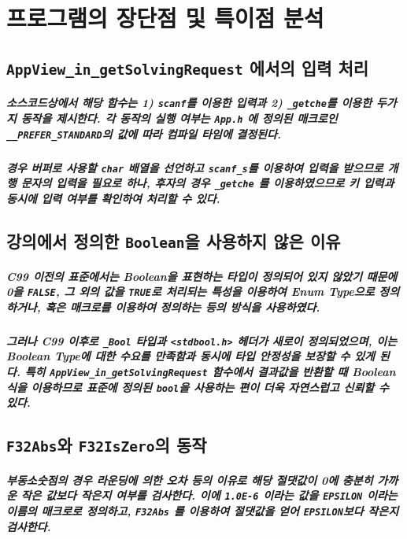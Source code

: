 \documentclass{article}
\begin{document}
    \section{프로그램의 장단점 및 특이점 분석}
    
    \subsection{\texttt{AppView\_in\_getSolvingRequest} 에서의 입력 처리}

    \subparagraph{ 소스코드상에서 해당 함수는 1) \texttt{scanf}를 이용한 입력과 2) \texttt{\_getche}를 이용한 두가지 동작을 제시한다. 각 동작의 실행 여부는 \texttt{App.h} 에 정의된 매크로인 \texttt{\_\_PREFER\_STANDARD}의 값에 따라 컴파일 타임에 결정된다.}

    \subparagraph{ 경우 버퍼로 사용할 \texttt{char} 배열을 선언하고 \texttt{scanf\_s}를 이용하여 입력을 받으므로 개행 문자의 입력을 필요로 하나, 후자의 경우 \texttt{\_getche} 를 이용하였으므로 키 입력과 동시에 입력 여부를 확인하여 처리할 수 있다.}

    \subsection{강의에서 정의한 \texttt{Boolean}을 사용하지 않은 이유}

    \subparagraph{\normalfont C99 이전의 표준에서는 Boolean을 표현하는 타입이 정의되어 있지 않았기 때문에 0을 \texttt{FALSE}, 그 외의 값을 \texttt{TRUE}로 처리되는 특성을 이용하여 Enum Type으로 정의하거나, 혹은 매크로를 이용하여 정의하는 등의 방식을 사용하였다.}

    \subparagraph{\normalfont 그러나 C99 이후로 \texttt{\_Bool} 타입과 \texttt{<stdbool.h>} 헤더가 새로이 정의되었으며, 이는 Boolean Type에 대한 수요를 만족함과 동시에 타입 안정성을 보장할 수 있게 된다. 특히 \texttt{AppView\_in\_getSolvingRequest} 함수에서 결과값을 반환할 때 Boolean 식을 이용하므로 표준에 정의된 \texttt{bool}을 사용하는 편이 더욱 자연스럽고 신뢰할 수 있다.}

    \subsection{\texttt{F32Abs}와 \texttt{F32IsZero}의 동작}

    \subparagraph{ 부동소숫점의 경우 라운딩에 의한 오차 등의 이유로 해당 절댓값이 0에 충분히 가까운 작은 값보다 작은지 여부를 검사한다. 이에 \texttt{1.0E-6} 이라는 값을 \texttt{EPSILON} 이라는 이름의 매크로로 정의하고, \texttt{F32Abs} 를 이용하여 절댓값을 얻어 \texttt{EPSILON}보다 작은지 검사한다.}
\end{document}
